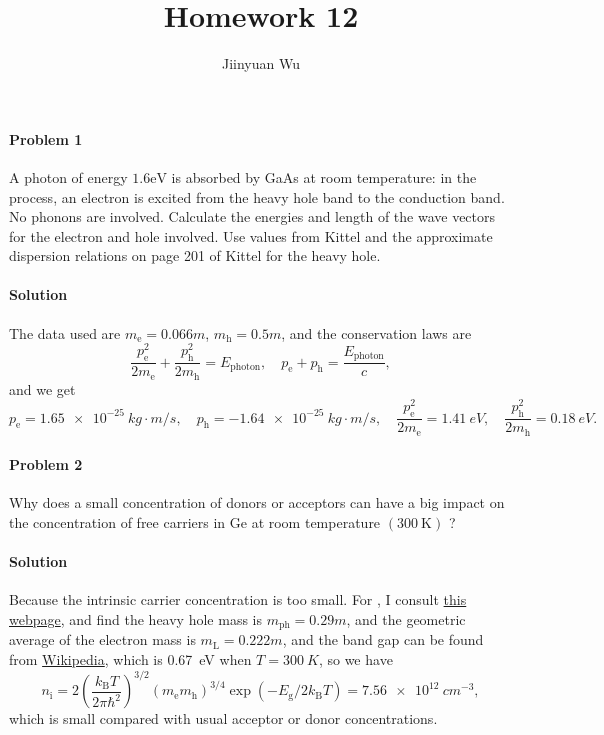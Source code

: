 \documentclass[hyperref, a4paper]{article}
\title{Homework 12}
\author{Jiinyuan Wu}
\begin{document}
    
\maketitle

\paragraph{Problem 1} A photon of energy $1.6 \mathrm{eV}$ is absorbed by GaAs at room temperature: in the process, an electron is excited from the heavy hole band to the conduction band. No phonons are involved. Calculate the energies and length of the wave vectors for the electron and hole involved. Use values from Kittel and the approximate dispersion relations on page 201 of Kittel for the heavy hole.

\paragraph{Solution} The data used are $m_{\text{e}} = 0.066m$, 
$m_{\text{h}} = 0.5 m$,
and the conservation laws are 
\begin{equation}
    \frac{p_{\text{e}}^2}{2m_{\text{e}}} + \frac{p_{\text{h}}^2}{2m_{\text{h}}} = E_{\text{photon}}, \quad 
    p_{\text{e}} + p_{\text{h}} = \frac{E_{\text{photon}}}{c} ,
\end{equation}
and we get 
\begin{equation}
    p_{\text{e}} = \SI{1.65e-25}{kg \cdot m/s}, \quad 
    p_{\text{h}} = \SI{-1.64e-25}{kg \cdot m/s}, \quad 
    \frac{p_{\text{e}}^2}{2m_{\text{e}}} = \SI{1.41}{eV}, \quad 
    \frac{p_{\text{h}}^2}{2m_{\text{h}}} = \SI{0.18}{eV}.
\end{equation}

\paragraph{Problem 2} Why does a small concentration of donors or acceptors can have a big impact on the concentration of free carriers in Ge at room temperature $(300 \mathrm{~K})$ ?

\paragraph{Solution} Because the intrinsic carrier concentration is too small.
For , I consult \href{https://www.iue.tuwien.ac.at/phd/palankovski/node40.html}{this webpage},
and find the heavy hole mass is $m_{\text{ph}} = 0.29m$,
and the geometric average of the electron mass is 
$m_{\text{L}} = 0.222m$, 
and the band gap can be found from \href{https://en.wikipedia.org/wiki/Germanium}{Wikipedia},
which is \SI{0.67}{eV} when $T = \SI{300}{K}$,
so we have 
\begin{equation}
    n_{\mathrm{i}}=2\left(\frac{k_{\mathrm{B}} T}{2 \pi \hbar^2}\right)^{3 / 2}\left(m_{\mathrm{e}} m_{\mathrm{h}}\right)^{3 / 4} \exp \left(-E_{\mathrm{g}} / 2 k_{\mathrm{B}} T\right) = \SI{7.56e12}{cm^{-3}},
\end{equation}
which is small compared with usual acceptor or donor concentrations.
\end{document}
